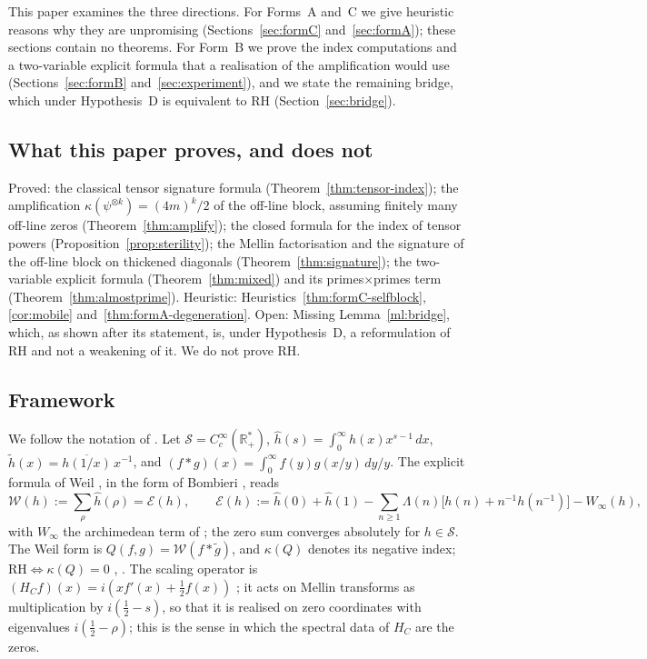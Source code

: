\documentclass[11pt]{amsart}
\theoremstyle{definition}
\theoremstyle{remark}
\newcommand{\RH}{\mathrm{RH}}
\newcommand{\bbR}{\mathbb{R}}
\newcommand{\Rp}{\bbR_+^*}
\newcommand{\Scal}{\mathcal{S}}
\newcommand{\Wcal}{\mathcal{W}}
\newcommand{\Ecal}{\mathcal{E}}
\newcommand{\La}{\Lambda}
\begin{document}
This paper examines the three directions. For Forms~A and~C we give heuristic reasons why they
are unpromising (Sections~\ref{sec:formC} and~\ref{sec:formA}); these sections contain no
theorems. For Form~B we prove the index computations and a two-variable explicit formula that a
realisation of the amplification would use (Sections~\ref{sec:formB}
and~\ref{sec:experiment}), and we state the remaining bridge, which under Hypothesis~D is equivalent to RH
(Section~\ref{sec:bridge}).

\subsection{What this paper proves, and does not}
Proved: the classical tensor signature formula (Theorem~\ref{thm:tensor-index}); the
amplification $\kappa(\psi^{\otimes k})=(4m)^k/2$ of the off-line block, assuming finitely many
off-line zeros (Theorem~\ref{thm:amplify}); the closed formula for the index of tensor powers
(Proposition~\ref{prop:sterility}); the Mellin factorisation and the signature of the off-line
block on thickened diagonals (Theorem~\ref{thm:signature}); the two-variable explicit formula
(Theorem~\ref{thm:mixed}) and its primes$\times$primes term (Theorem~\ref{thm:almostprime}).
Heuristic: Heuristics~\ref{thm:formC-selfblock}, \ref{cor:mobile}
and~\ref{thm:formA-degeneration}. Open: Missing Lemma~\ref{ml:bridge}, which, as shown after
its statement, is, under Hypothesis~D, a reformulation of RH and not a weakening of it. We do not prove RH.

\subsection{Framework}\label{ssec:framework}
We follow the notation of \cite{P25}. Let $\Scal=C_c^\infty(\Rp)$, $\hat h(s)=\int_0^\infty
h(x)x^{s-1}\,dx$, $\tilde h(x)=\overline{h(1/x)}\,x^{-1}$, and $(f*g)(x)=\int_0^\infty
f(y)g(x/y)\,dy/y$. The explicit formula of Weil \cite{Weil52}, in the form of
Bombieri \cite{Bombieri00}, reads
\[
\Wcal(h):=\sum_\rho\hat h(\rho)=\Ecal(h),\qquad
\Ecal(h):=\hat h(0)+\hat h(1)-\sum_{n\ge1}\La(n)\bigl[h(n)+n^{-1}h(n^{-1})\bigr]-W_\infty(h),
\]
with $W_\infty$ the archimedean term of \cite[Def.~2.1]{P25}; the zero sum converges
absolutely for $h\in\Scal$. The Weil form is $Q(f,g)=\Wcal(f*\tilde g)$, and $\kappa(Q)$ denotes
its negative index; $\RH\iff\kappa(Q)=0$ \cite{Weil52}, \cite[Def.~2.3]{P25}. The scaling
operator is $(H_Cf)(x)=i(xf'(x)+\tfrac12f(x))$ \cite[Def.~3.1]{P25}; it acts on Mellin
transforms as multiplication by $i(\tfrac12-s)$, so that it is realised on zero coordinates
with eigenvalues $i(\tfrac12-\rho)$; this is the sense in which the spectral data of $H_C$ are
the zeros.
\end{document}
